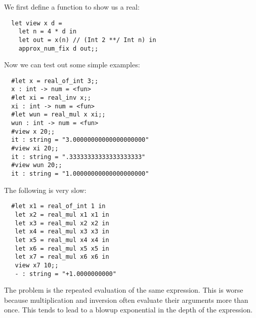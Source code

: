 \begin{slide*}


\vspace*{0.2cm}

We first define a function to show us a real:
\begin{black}\begin{verbatim}
  let view x d =
    let n = 4 * d in
    let out = x(n) // (Int 2 **/ Int n) in
    approx_num_fix d out;;
\end{verbatim}\end{black}
Now we can test out some simple examples:
\begin{black}\begin{verbatim}
  #let x = real_of_int 3;;
  x : int -> num = <fun>
  #let xi = real_inv x;;
  xi : int -> num = <fun>
  #let wun = real_mul x xi;;
  wun : int -> num = <fun>
  #view x 20;;
  it : string = "3.00000000000000000000"
  #view xi 20;;
  it : string = ".33333333333333333333"
  #view wun 20;;
  it : string = "1.00000000000000000000"
\end{verbatim}\end{black}

\end{slide*}





\begin{slide*}


\vspace*{0.5cm}

The following is very slow:

\begin{black}\begin{verbatim}
  #let x1 = real_of_int 1 in
   let x2 = real_mul x1 x1 in
   let x3 = real_mul x2 x2 in
   let x4 = real_mul x3 x3 in
   let x5 = real_mul x4 x4 in
   let x6 = real_mul x5 x5 in
   let x7 = real_mul x6 x6 in
   view x7 10;;
   - : string = "+1.0000000000"
\end{verbatim}\end{black}

The problem is the repeated evaluation of the same expression. This is worse
because multiplication and inversion often evaluate their arguments more than
once. This tends to lead to a blowup exponential in the depth of the
expression.

\end{slide*}



